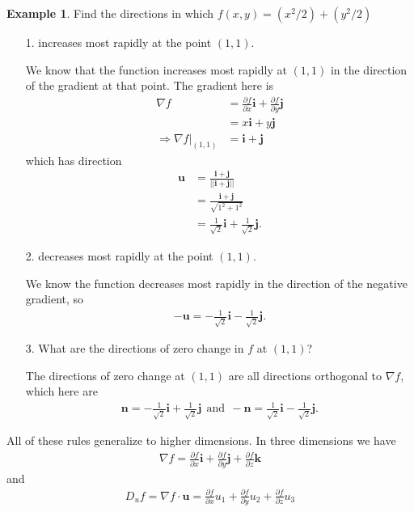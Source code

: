 \documentclass[12pt, letter]{article}
\theoremstyle{plain}
\numberwithin{theorem}{section}
\theoremstyle{definition}
\newtheorem{example}[theorem]{Example}
\begin{document}
\begin{example}
Find the directions in which $f(x,y) = (x^2/2) + (y^2/2)$
\begin{itemize}
\item[1.] increases most rapidly at the point $(1,1)$.

\smallskip

We know that the function increases most rapidly at $(1,1)$ in the direction of the gradient at that point. The gradient here is
\begin{align*}
\nabla f &= \frac{\partial f}{\partial x}\bm{i} + \frac{\partial f}{\partial y}\bm{j}\\
&= x\bm{i} + y\bm{j}\\
\Rightarrow \nabla f \rvert_{(1,1)} &= \bm{i} + \bm{j}
\end{align*}
which has direction
\begin{align*}
\bm{u} &= \frac{\bm{i}+\bm{j}}{||\bm{i}+\bm{j}||}\\
&= \frac{\bm{i} + \bm{j}}{\sqrt{1^2+1^2}}\\
&= \frac{1}{\sqrt{2}}\bm{i} + \frac{1}{\sqrt{2}}\bm{j}.
\end{align*}

\item[2.] decreases most rapidly at the point $(1,1)$.

\smallskip

We know the function decreases most rapidly in the direction of the negative gradient, so
\begin{align*}
-\bm{u} = -\frac{1}{\sqrt{2}} \bm{i} - \frac{1}{\sqrt{2}} \bm{j}.
\end{align*}

\item[3.] What are the directions of zero change in $f$ at $(1,1)$?

\smallskip

The directions of zero change at $(1,1)$ are all directions orthogonal to $\nabla f$, which here are
\begin{align*}
\bm{n} = -\frac{1}{\sqrt{2}} \bm{i} + \frac{1}{\sqrt{2}} \bm{j} \ \ \text{and} \ \ -\bm{n} = \frac{1}{\sqrt{2}} \bm{i} - \frac{1}{\sqrt{2}} \bm{j}.
\end{align*}
\end{itemize}
\end{example}

\bigskip

\hrulefill

\bigskip

All of these rules generalize to higher dimensions. In three dimensions we have
\begin{align*}
\nabla f = \frac{\partial f}{\partial x} \bm{i} + \frac{\partial f}{\partial y} \bm{j} + \frac{\partial f}{\partial z} \bm{k}
\end{align*}
and
\begin{align*}
D_u f = \nabla f \cdot \bm{u} = \frac{\partial f}{\partial x} u_1 + \frac{\partial f}{\partial y} u_2 + \frac{\partial f}{\partial z} u_3
\end{align*}
\end{document}
